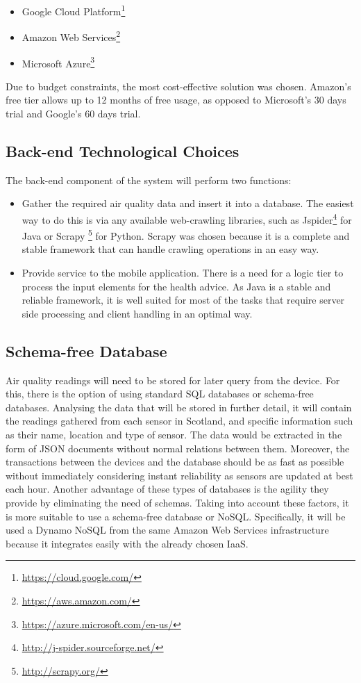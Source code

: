 \begin{itemize}
	\item Google Cloud Platform\footnote{\url{https://cloud.google.com/}}
    \item Amazon Web Services\footnote{\url{https://aws.amazon.com/}}
    \item Microsoft Azure\footnote{\url{https://azure.microsoft.com/en-us/}}
\end{itemize}

Due to budget constraints, the most cost-effective solution was chosen. Amazon's free tier allows up to 12 months of free usage, as opposed to Microsoft's 30 days trial and Google's 60 days trial.

\subsection{Back-end Technological Choices}
The back-end component of the system will perform two functions: 

\begin{itemize}
	\item Gather the required air quality data and insert it into a database. The easiest way to do this is via any available web-crawling libraries, such as Jspider\footnote{\url{http://j-spider.sourceforge.net/}} for Java or Scrapy \footnote{\url{http://scrapy.org/}} for Python. Scrapy was chosen because it is a complete and stable framework that can handle crawling operations in an easy way. 
	\item Provide service to the mobile application. There is a need for a logic tier to process the input elements for the health advice. As Java is a stable and reliable framework,  it is well suited for most of the tasks that require server side processing and client handling in an optimal way.
\end{itemize}

\subsection{Schema-free Database}

Air quality readings will need to be stored for later query from the device. For this, there is the option of using standard SQL databases or schema-free databases. Analysing the data that will be stored in further detail, it will contain the readings gathered from each sensor in Scotland, and specific information such as their name, location and type of sensor. The data would be extracted in the form of JSON documents without normal relations between them. Moreover, the transactions between the devices and the database should be as fast as possible without immediately considering instant reliability as sensors are updated at best each hour. Another advantage of these types of databases is the agility they provide by eliminating the need of schemas. Taking into account these factors, it is more suitable to use a schema-free database or NoSQL. Specifically, it will be used a Dynamo NoSQL from the same Amazon Web Services infrastructure because it integrates easily with the already chosen IaaS.

